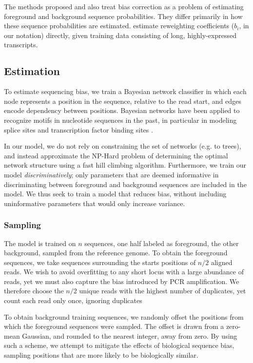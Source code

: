 \documentclass{bioinfo}
\begin{document}
The methods proposed \citet{Hansen2010} and \cite{Roberts2011} also treat bias
correction as a problem of estimating foreground and background sequence
probabilities. They differ primarily in how these sequence probabilities are
estimated. \citet{Li2010} estimate reweighting coefficients ($b_i$, in our
notation) directly, given training data consisting of long, highly-expressed
transcripts.



\subsection{Estimation}

To estimate sequencing bias, we train a Bayesian network classifier in which
each node represents a position in the sequence, relative to the read start, and
edges encode dependency between positions.  Bayesian networks have been applied
to recognize motifs in nucleotide sequences in the past, in particular in
modeling splice sites \citep{Cai2000, Chen2005} and transcription factor binding
sites \citep{Ben-Gal2005, Grau2006, Pudimat2005}. 

In our model, we do not rely on constraining the set of networks (e.g. to
trees), and instead approximate the NP-Hard problem of determining the optimal
network structure using a fast hill climbing algorithm. Furthermore, we
train our model \emph{discriminatively}; only parameters that are deemed
informative in discriminating between foreground and background sequences are
included in the model. We thus seek to train a model that reduces bias, without
including uninformative parameters that would only increase variance.


\subsubsection{Sampling}

The model is trained on $n$ sequences, one half labeled as foreground, the other
background, sampled from the reference genome. To obtain the foreground
sequences, we take sequences surrounding the starts positions of $n/2$ aligned
reads. We wish to avoid overfitting to any short locus with a large abundance of reads,
yet we must also capture the bias introduced by PCR amplification. We therefore
choose the $n/2$ unique reads with the highest number of duplicates,
yet count each read only once, ignoring duplicates

To obtain background training sequences, we randomly offset the positions from
which the foreground sequences were sampled.  The offset is drawn from a
zero-mean Gaussian, and rounded to the nearest integer, away from zero.
By using such a scheme, we attempt to mitigate the effects of biological
sequence bias, sampling positions that are more likely to be biologically
similar.
\end{document}
